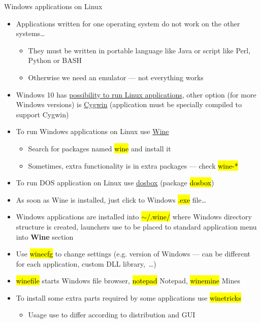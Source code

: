 \documentclass[compress, ucs, xelatex, 11pt, xcolor=svgnames,
  hyperref={
    bookmarks=true,
    unicode=true,
    colorlinks=true,
    pdftitle={Linux, command line and MetaCentrum},
    plainpages=false,
    pdfauthor={Vojtech Zeisek},
    pdfsubject={Course about use of Linux command line, writing shell scripts and using MetaCentrum of CESNET},
    pdfcreator={XeLaTeX},
    pdfkeywords={Linux, GNU, BASH, shell, command line, MetaCentrum},
    linkcolor=DarkRed,
    anchorcolor=DarkBlue,
    citecolor=Indigo,
    filecolor=NavyBlue,
    menucolor=DarkMagenta,
    urlcolor=DarkBlue,
    pdftex},
  url={hyphens, lowtilde} %
  ]{beamer}
\renewcommand{\texttt}[1]{\hl{\ttfamily #1}}
\begin{document}
\begin{frame}[allowframebreaks]{Windows applications on Linux}
  \begin{itemize}
    \item Applications written for one operating system do not work on the other systems\ldots
    \begin{itemize}
      \item They must be written in portable language like Java or script like Perl, Python or BASH
      \item Otherwise we need an emulator --- not everything works
    \end{itemize}
    \item Windows 10 has \href{https://docs.microsoft.com/windows/wsl/install-win10}{possibility to run Linux applications}, other option (for more Windows versions) is \href{https://www.cygwin.com/}{Cygwin} (application must be specially compiled to support Cygwin)
    \item To run Windows applications on Linux use \href{https://www.winehq.org/}{Wine}
    \begin{itemize}
      \item Search for packages named \texttt{wine} and install it
      \item Sometimes, extra functionality is in extra packages --- check \texttt{wine-*}
    \end{itemize}
    \item To run DOS application on Linux use \href{https://www.dosbox.com/}{dosbox} (package \texttt{dosbox})
    \item As soon as Wine is installed, just click to Windows \texttt{*.exe} file\ldots
    \item Windows applications are installed into \texttt{$\sim$/.wine/} where Windows directory structure is created, launchers use to be placed to standard application menu into \textbf{Wine} section
    \item Use \texttt{winecfg} to change settings (e.g. version of Windows --- can be different for each application, custom DLL library,~\ldots)
    \item \texttt{winefile} starts Windows file browser, \texttt{notepad} Notepad, \texttt{winemine} Mines
    \item To install some extra parts required by some applications use \texttt{winetricks}
    \begin{itemize}
      \item Usage use to differ according to distribution and GUI

\end{itemize}
\end{itemize}
\end{frame}
\end{document}
